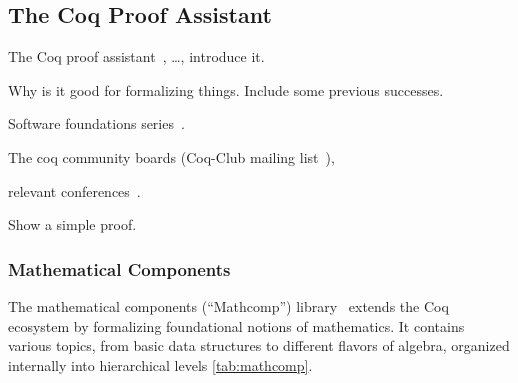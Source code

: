 \subsection{The Coq Proof Assistant}
\label{subsec:coq}

The Coq proof assistant~\cite{coq}, \dots, introduce it.

Why is it good for formalizing things.
Include some previous successes.

Software foundations series~\cite{softwarefoundation1, softwarefoundation2}.

The coq community boards (Coq-Club mailing list~\cite{coqclub}),

relevant conferences~\cite{itp, cpp}.

Show a simple proof.

\subsubsection{Mathematical Components}

The mathematical components (\enquote{Mathcomp}) library~\cite{mahboubi2022} extends the Coq ecosystem by formalizing foundational notions of mathematics.
It contains various topics, from basic data structures to different flavors of algebra, organized internally into hierarchical levels
\autoref{tab:mathcomp}.

